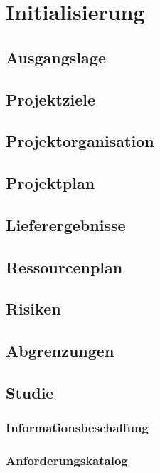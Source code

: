 \chapter{Initialisierung}

\label{ReportInitialisierung}

\section{Ausgangslage}

\section{Projektziele}

\section{Projektorganisation}

\section{Projektplan}

\section{Lieferergebnisse}

\section{Ressourcenplan}

\section{Risiken}

\section{Abgrenzungen}

\section{Studie}

\subsection{Informationsbeschaffung}

\subsection{Anforderungskatalog}

